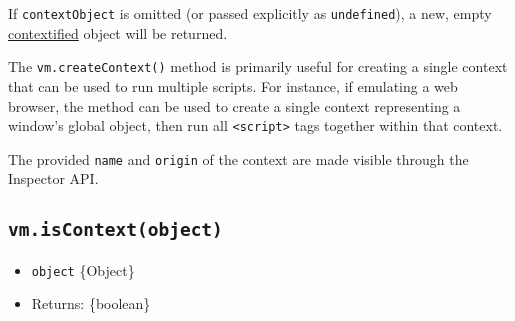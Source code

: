 \begin{Shaded}
\begin{Highlighting}[]
\OperatorTok{=} \NormalTok{(}\NormalTok{)}\OperatorTok{;}

 \OperatorTok{=} \OperatorTok{;}

\OperatorTok{=}\NormalTok{ \{ }\OperatorTok{:} \NormalTok{ \}}\OperatorTok{;}
\OperatorTok{;}

\NormalTok{(}\OperatorTok{,}\OperatorTok{;}

\OperatorTok{;}

\NormalTok{(}\NormalTok{)}\OperatorTok{;}
\end{Highlighting}
\end{Shaded}

If \texttt{contextObject} is omitted (or passed explicitly as
\texttt{undefined}), a new, empty
\hyperref[what-does-it-mean-to-contextify-an-object]{contextified}
object will be returned.

The \texttt{vm.createContext()} method is primarily useful for creating
a single context that can be used to run multiple scripts. For instance,
if emulating a web browser, the method can be used to create a single
context representing a window's global object, then run all
\texttt{\textless{}script\textgreater{}} tags together within that
context.

The provided \texttt{name} and \texttt{origin} of the context are made
visible through the Inspector API.

\subsection{\texorpdfstring{\texttt{vm.isContext(object)}}{vm.isContext(object)}}\label{vm.iscontextobject}

\begin{itemize}
\tightlist
\item
  \texttt{object} \{Object\}
\item
  Returns: \{boolean\}
\end{itemize}

